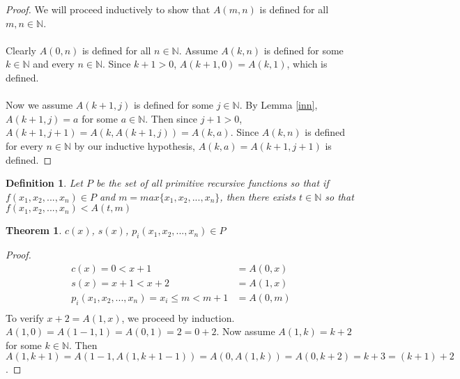 \documentclass[12pt, letterpaper]{article}
\newtheorem{theorem}{Theorem}
\newtheorem*{definition}{Definition}
\begin{document}
    \begin{proof}
      We will proceed inductively to show that $A(m, n)$ is defined for all $m, n \in \mathbb{N}$.
      \\ 
      \\
      Clearly $A(0, n)$ is defined for all $n \in \mathbb{N}$.
      Assume $A(k, n)$ is defined for some $k \in \mathbb{N}$ and every $n \in \mathbb{N}$.
      Since $k + 1 > 0$, $A(k + 1, 0) = A(k, 1)$, which is defined.
      \\
      \\
      Now we assume $A(k + 1, j)$ is defined for some $j \in \mathbb{N}$.
      By Lemma \ref{inn}, $A(k + 1, j) = a$ for some $a \in \mathbb{N}$.
      Then since $j + 1 > 0$, $A(k + 1, j + 1) = A(k, A(k + 1, j)) = A(k, a)$.
      Since $A(k, n)$ is defined for every $n \in \mathbb{N}$ by our inductive hypothesis,
      $A(k, a) = A(k + 1, j + 1)$ is defined.
    \end{proof}
    
    \begin{definition}
      Let $P$ be the set of all primitive recursive functions so that if $f(x_1, x_2, ..., x_n) \in P$ and
      $m = max\{x_1, x_2, ..., x_n\}$, then there exists $t \in \mathbb{N}$ so that 
      $f(x_1, x_2, ..., x_n) < A(t, m)$
    \end{definition}

    \begin{theorem}
      $c(x)$, $s(x)$, $p_i(x_1, x_2, ..., x_n) \in P$
    \end{theorem}
    \begin{proof}
      \begin{equation*}
        \begin{aligned}
          c(x) = 0 < x + 1 &= A(0, x) \\
          s(x) = x + 1 < x + 2 &= A(1, x) \\
          p_i(x_1, x_2, ..., x_n) = x_i \leq m < m + 1 &= A(0, m) \\
        \end{aligned}
      \end{equation*}
      To verify $x + 2 = A(1, x)$, we proceed by induction. \\
      $A(1, 0) = A(1 - 1, 1) = A(0, 1) = 2 = 0 + 2$. Now assume $A(1, k) = k + 2$ for some $k \in \mathbb{N}$.
      Then $A(1, k + 1) = A(1 - 1, A(1, k + 1 - 1)) = A(0, A(1, k)) = A(0, k + 2) = k + 3 = (k + 1) + 2$.
    \end{proof}
\end{document}

